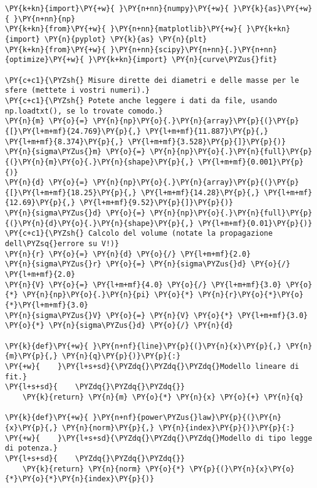 \begin{Verbatim}[label=\makebox{\href{https://github.com/unipi-physics-labs/lab1-sheets/tree/main/snippy/densita.py}{https://github.com/.../densita.py}},commandchars=\\\{\}]
\PY{k+kn}{import}\PY{+w}{ }\PY{n+nn}{numpy}\PY{+w}{ }\PY{k}{as}\PY{+w}{ }\PY{n+nn}{np}
\PY{k+kn}{from}\PY{+w}{ }\PY{n+nn}{matplotlib}\PY{+w}{ }\PY{k+kn}{import} \PY{n}{pyplot} \PY{k}{as} \PY{n}{plt}
\PY{k+kn}{from}\PY{+w}{ }\PY{n+nn}{scipy}\PY{n+nn}{.}\PY{n+nn}{optimize}\PY{+w}{ }\PY{k+kn}{import} \PY{n}{curve\PYZus{}fit}

\PY{c+c1}{\PYZsh{} Misure dirette dei diametri e delle masse per le sfere (mettete i vostri numeri).}
\PY{c+c1}{\PYZsh{} Potete anche leggere i dati da file, usando np.loadtxt(), se lo trovate comodo.}
\PY{n}{m} \PY{o}{=} \PY{n}{np}\PY{o}{.}\PY{n}{array}\PY{p}{(}\PY{p}{[}\PY{l+m+mf}{24.769}\PY{p}{,} \PY{l+m+mf}{11.887}\PY{p}{,} \PY{l+m+mf}{8.374}\PY{p}{,} \PY{l+m+mf}{3.528}\PY{p}{]}\PY{p}{)}
\PY{n}{sigma\PYZus{}m} \PY{o}{=} \PY{n}{np}\PY{o}{.}\PY{n}{full}\PY{p}{(}\PY{n}{m}\PY{o}{.}\PY{n}{shape}\PY{p}{,} \PY{l+m+mf}{0.001}\PY{p}{)}
\PY{n}{d} \PY{o}{=} \PY{n}{np}\PY{o}{.}\PY{n}{array}\PY{p}{(}\PY{p}{[}\PY{l+m+mf}{18.25}\PY{p}{,} \PY{l+m+mf}{14.28}\PY{p}{,} \PY{l+m+mf}{12.69}\PY{p}{,} \PY{l+m+mf}{9.52}\PY{p}{]}\PY{p}{)}
\PY{n}{sigma\PYZus{}d} \PY{o}{=} \PY{n}{np}\PY{o}{.}\PY{n}{full}\PY{p}{(}\PY{n}{d}\PY{o}{.}\PY{n}{shape}\PY{p}{,} \PY{l+m+mf}{0.01}\PY{p}{)}
\PY{c+c1}{\PYZsh{} Calcolo del volume (notate la propagazione dell\PYZsq{}errore su V!)}
\PY{n}{r} \PY{o}{=} \PY{n}{d} \PY{o}{/} \PY{l+m+mf}{2.0}
\PY{n}{sigma\PYZus{}r} \PY{o}{=} \PY{n}{sigma\PYZus{}d} \PY{o}{/} \PY{l+m+mf}{2.0}
\PY{n}{V} \PY{o}{=} \PY{l+m+mf}{4.0} \PY{o}{/} \PY{l+m+mf}{3.0} \PY{o}{*} \PY{n}{np}\PY{o}{.}\PY{n}{pi} \PY{o}{*} \PY{n}{r}\PY{o}{*}\PY{o}{*}\PY{l+m+mf}{3.0}
\PY{n}{sigma\PYZus{}V} \PY{o}{=} \PY{n}{V} \PY{o}{*} \PY{l+m+mf}{3.0} \PY{o}{*} \PY{n}{sigma\PYZus{}d} \PY{o}{/} \PY{n}{d}

\PY{k}{def}\PY{+w}{ }\PY{n+nf}{line}\PY{p}{(}\PY{n}{x}\PY{p}{,} \PY{n}{m}\PY{p}{,} \PY{n}{q}\PY{p}{)}\PY{p}{:}
\PY{+w}{    }\PY{l+s+sd}{\PYZdq{}\PYZdq{}\PYZdq{}Modello lineare di fit.}
\PY{l+s+sd}{    \PYZdq{}\PYZdq{}\PYZdq{}}
    \PY{k}{return} \PY{n}{m} \PY{o}{*} \PY{n}{x} \PY{o}{+} \PY{n}{q}

\PY{k}{def}\PY{+w}{ }\PY{n+nf}{power\PYZus{}law}\PY{p}{(}\PY{n}{x}\PY{p}{,} \PY{n}{norm}\PY{p}{,} \PY{n}{index}\PY{p}{)}\PY{p}{:}
\PY{+w}{    }\PY{l+s+sd}{\PYZdq{}\PYZdq{}\PYZdq{}Modello di tipo legge di potenza.}
\PY{l+s+sd}{    \PYZdq{}\PYZdq{}\PYZdq{}}
    \PY{k}{return} \PY{n}{norm} \PY{o}{*} \PY{p}{(}\PY{n}{x}\PY{o}{*}\PY{o}{*}\PY{n}{index}\PY{p}{)}


\end{Verbatim}
